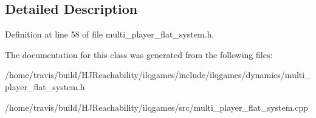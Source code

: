 \subsection{Detailed Description}


Definition at line 58 of file multi\+\_\+player\+\_\+flat\+\_\+system.\+h.



The documentation for this class was generated from the following files\+:\begin{DoxyCompactItemize}
\item 
/home/travis/build/\+H\+J\+Reachability/ilqgames/include/ilqgames/dynamics/multi\+\_\+player\+\_\+flat\+\_\+system.\+h\item 
/home/travis/build/\+H\+J\+Reachability/ilqgames/src/multi\+\_\+player\+\_\+flat\+\_\+system.\+cpp\end{DoxyCompactItemize}
